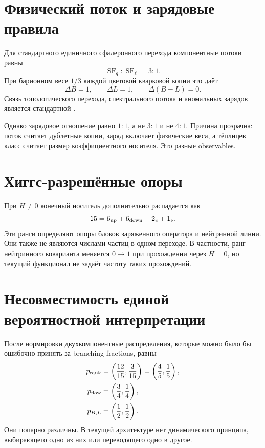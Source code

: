 \section{Физический поток и зарядовые правила}

Для стандартного единичного сфалеронного перехода компонентные потоки
равны
\begin{equation}
 \operatorname{SF}_q:\operatorname{SF}_\ell=3:1.
 \label{eq:v6-component-observable-flow-ratio}
\end{equation}
При барионном весе $1/3$ каждой цветовой кварковой копии это даёт
\begin{equation}
 \Delta B=1,
 \qquad
 \Delta L=1,
 \qquad
 \Delta(B-L)=0.
 \label{eq:v6-component-observable-charge-rule}
\end{equation}
Связь топологического перехода, спектрального потока и аномальных
зарядов является стандартной
\cite{component-observable-klinkhamer-rupp2003,
component-observable-krs1985}.

Однако зарядовое отношение равно $1:1$, а не $3:1$ и не $4:1$.
Причина прозрачна: поток считает дублетные копии, заряд включает
физические веса, а тёплицев класс считает размер коэффициентного
носителя. Это разные observables.

\section{Хиггс-разрешённые опоры}

При $H\ne0$ конечный носитель дополнительно распадается как
\begin{equation}
 15=6_{\rm up}+6_{\rm down}+2_e+1_\nu.
 \label{eq:v6-component-observable-higgs-supports}
\end{equation}
Эти ранги определяют опоры блоков заряженного оператора и нейтринной
линии. Они также не являются числами частиц в одном переходе. В
частности, ранг нейтринного коварианта меняется $0\to1$ при прохождении
через $H=0$, но текущий функционал не задаёт частоту таких прохождений.

\section{Несовместимость единой вероятностной интерпретации}

После нормировки двухкомпонентные распределения, которые можно было бы
ошибочно принять за branching fractions, равны
\begin{align}
 p_{\rm rank}&=\left(\frac{12}{15},\frac3{15}\right)
 =\left(\frac45,\frac15\right),\\
 p_{\rm flow}&=\left(\frac34,\frac14\right),\\
 p_{B,L}&=\left(\frac12,\frac12\right).
\end{align}
Они попарно различны. В текущей архитектуре нет динамического принципа,
выбирающего одно из них или переводящего одно в другое.

